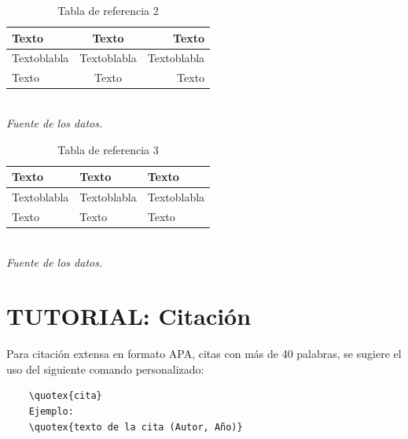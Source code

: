 \begin{minipage}[H]{0.49\textwidth}
    \begin{table}[H]
        \centering
        \begin{measuredfigure}
            \caption{Tabla de referencia 2}
            \begin{tabular}{| l | c | r |} 
            \hline
                \textbf{Texto} & \textbf{Texto} & \textbf{Texto} \\ \hline
                Textoblabla    & Textoblabla   & Textoblabla \\ \hline
                Texto    & Texto   & Texto \\ \hline
            \end{tabular}
        \end{measuredfigure}
        \\ \textit{\scriptsize{Fuente de los datos.}}
    \end{table}
\end{minipage}
\begin{minipage}[H]{0.49\textwidth}
    \begin{table}[H]
        \centering
        \begin{measuredfigure}
            \caption{Tabla de referencia 3}
            \begin{tabular}{l l l}
            \toprule
                \textbf{Texto} & \textbf{Texto} & \textbf{Texto} \\
                \midrule
                Textoblabla    & Textoblabla   & Textoblabla \\
                Texto    & Texto   & Texto \\
                \bottomrule
            \end{tabular}
        \end{measuredfigure}
        \\ \textit{\scriptsize{Fuente de los datos.}}
    \end{table}
\end{minipage}

\newpage
\section{TUTORIAL: Citación}

Para citación extensa en formato APA, citas con más de 40 palabras, se sugiere el uso del siguiente comando personalizado:

\begin{verbatim} 
    \quotex{cita}
    Ejemplo:
    \quotex{texto de la cita (Autor, Año)}
\end{verbatim}


